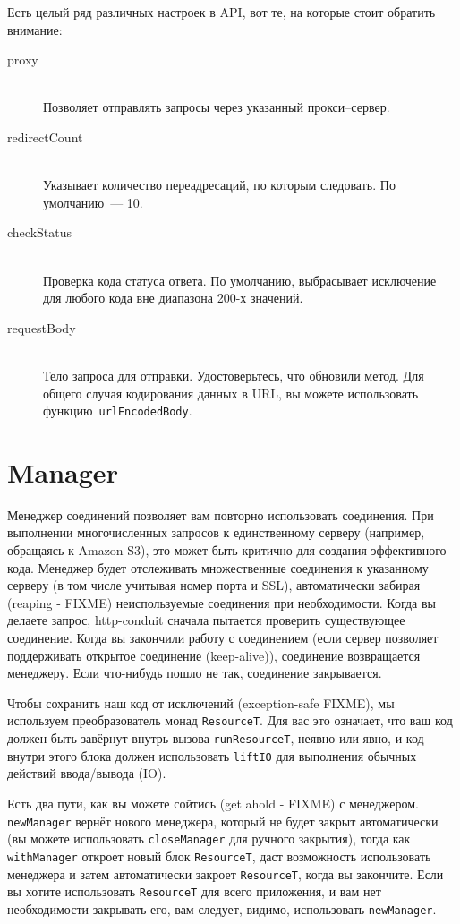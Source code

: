 Есть целый ряд различных настроек в API, вот те, на которые стоит
обратить внимание:
\begin{description}
\item[proxy] \hfill \\
  Позволяет отправлять запросы через указанный прокси--сервер.
\item[redirectCount] \hfill \\
  Указывает количество переадресаций, по которым следовать. По
  умолчанию~--- 10.
\item[checkStatus] \hfill \\
  Проверка кода статуса ответа. По умолчанию, выбрасывает исключение
  для любого кода вне диапазона 200-х значений.
\item[requestBody] \hfill \\
  Тело запроса для отправки. Удостоверьтесь, что обновили метод. Для
  общего случая кодирования данных в URL, вы можете использовать
  функцию~\lstinline!urlEncodedBody!.
\end{description}

\section{Manager}
Менеджер соединений позволяет вам повторно использовать
соединения. При выполнении многочисленных запросов к единственному
серверу (например, обращаясь к Amazon S3), это может быть критично для
создания эффективного кода. Менеджер будет отслеживать множественные
соединения к указанному серверу (в том числе учитывая номер порта и
SSL), автоматически забирая (reaping - FIXME) неиспользуемые
соединения при необходимости. Когда вы делаете запрос, http-conduit
сначала пытается проверить существующее соединение. Когда вы закончили
работу с соединением (если сервер позволяет поддерживать открытое
соединение (keep-alive)), соединение возвращается менеджеру. Если
что-нибудь пошло не так, соединение закрывается.

Чтобы сохранить наш код от исключений (exception-safe FIXME), мы
используем преобразователь монад \lstinline!ResourceT!. Для вас это
означает, что ваш код должен быть завёрнут внутрь вызова
\lstinline!runResourceT!, неявно или явно, и код внутри этого блока
должен использовать \lstinline!liftIO! для выполнения обычных действий
ввода/вывода (IO).

Есть два пути, как вы можете сойтись (get ahold - FIXME) с
менеджером. \lstinline!newManager! вернёт нового менеджера, который не
будет закрыт автоматически (вы можете использовать
\lstinline!closeManager! для ручного закрытия), тогда как
\lstinline!withManager! откроет новый блок \lstinline!ResourceT!, даст
возможность использовать менеджера и затем автоматически закроет
\lstinline!ResourceT!, когда вы закончите. Если вы хотите использовать
\lstinline!ResourceT! для всего приложения, и вам нет необходимости
закрывать его, вам следует, видимо, использовать \lstinline!newManager!.

